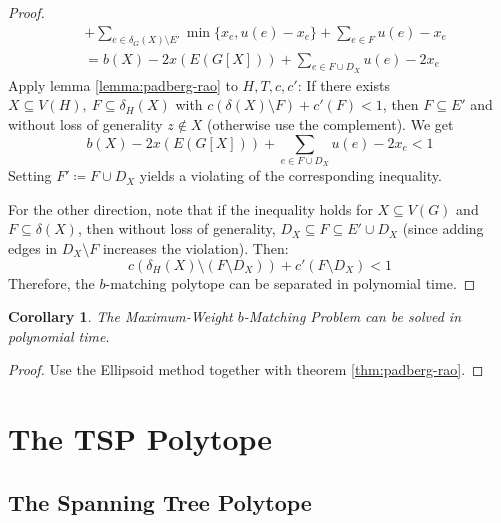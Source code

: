 \documentclass[11pt, a4paper]{article}
\newcommand{\set}[1]{\{#1\}}
\newtheorem{cor}[theorem]{Corollary}
\theoremstyle{remark}
\theoremstyle{definition}
\begin{document}
\begin{proof}
\begin{align*}
		                                & + \sum_{e\in\delta_G(X)\setminus E'}\min\set{x_e,u(e)-x_e} + \sum_{e\in F}u(e)-x_e \\
		                                & =b(X)-2x(E(G[X]))+\sum_{e\in F\cup D_X}u(e)-2x_e
	\end{align*}
	Apply lemma \ref{lemma:padberg-rao} to $H,T,c,c'$: If there exists
	$X\subseteq V(H),\ F\subseteq \delta_H(X)$ with $c(\delta(X)\setminus F)
		+c'(F)<1$, then $F\subseteq E'$ and without loss of generality $z\notin X$
	(otherwise use the complement). We get
	\[b(X)-2x(E(G[X]))+\sum_{e\in F\cup D_X}u(e)-2x_e<1\]
	Setting $F'\coloneqq F\cup D_X$ yields a violating of the
	corresponding inequality.

	For the other direction, note that if the inequality holds for
	$X\subseteq V(G)$ and $F\subseteq \delta(X)$, then without loss of
	generality, $D_X\subseteq F\subseteq E'\cup D_X$ (since adding edges
	in $D_X\setminus F$ increases the violation). Then:
	\[c(\delta_H(X)\setminus (F\setminus D_X))+c'(F\setminus D_X)<1\]
	Therefore, the $b$-matching polytope can be separated in polynomial
	time.
\end{proof}


\begin{cor}
	The Maximum-Weight $b$-Matching Problem can be solved in polynomial time.
\end{cor}
\begin{proof}
	Use the Ellipsoid method together with theorem \ref{thm:padberg-rao}.
\end{proof}

\section{The TSP Polytope}
\subsection{The Spanning Tree Polytope}
\end{document}
